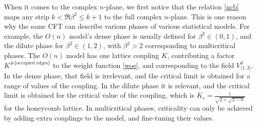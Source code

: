 \documentclass[12pt, a4paper]{article}
\theoremstyle{break}
\begin{document}
When it comes to the complex $n$-plane, we first notice that the relation \eqref{ncb} maps any strip $k<\Re \beta^2\leq k+1$ to the full complex $n$-plane. 
This is one reason why the same CFT can describe various phases of various statistical models. For example, the $O(n)$ model's dense phase is usually defined for $\beta^2\in (0,1)$, and the dilute phase for $\beta^2\in (1,2)$, with $\beta^2>2$ corresponding to multicritical phases. The $O(n)$ model has one lattice coupling $K$, contributing a factor $K^{\#\{\text{occupied edges}\}}$ to the weight function \eqref{woe}, and corresponding to the field $V^d_{\langle 1,3\rangle}$. In the dense phase, that field is irrelevant, and the critical limit is obtained for a range of values of the coupling. In the dilute phase it is relevant, and the critical limit is obtained for the critical value of the coupling, which is $K_c = \frac{1}{\sqrt{2+\sqrt{2-n}}}$ for the honeycomb lattice. In multicritical phases, criticality can only be achieved by adding extra couplings to the model, and fine-tuning their values. 
\end{document}
